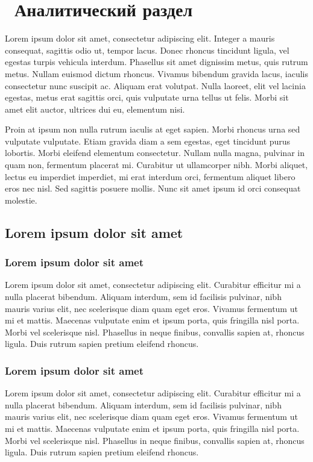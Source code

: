 \chapter{ Аналитический раздел}
\label{cha:analysis}
%
%
Lorem ipsum dolor sit amet, consectetur adipiscing elit. Integer a mauris consequat, sagittis odio ut, tempor lacus. Donec rhoncus tincidunt ligula, vel egestas turpis vehicula interdum. Phasellus sit amet dignissim metus, quis rutrum metus. Nullam euismod dictum rhoncus. Vivamus bibendum gravida lacus, iaculis consectetur nunc suscipit ac. Aliquam erat volutpat. Nulla laoreet, elit vel lacinia egestas, metus erat sagittis orci, quis vulputate urna tellus ut felis. Morbi sit amet elit auctor, ultrices dui eu, elementum nisi.

Proin at ipsum non nulla rutrum iaculis at eget sapien. Morbi rhoncus urna sed vulputate vulputate. Etiam gravida diam a sem egestas, eget tincidunt purus lobortis. Morbi eleifend elementum consectetur. Nullam nulla magna, pulvinar in quam non, fermentum placerat mi. Curabitur ut ullamcorper nibh. Morbi aliquet, lectus eu imperdiet imperdiet, mi erat interdum orci, fermentum aliquet libero eros nec nisl. Sed sagittis posuere mollis. Nunc sit amet ipsum id orci consequat molestie.




\section{Lorem ipsum dolor sit amet}
\subsection{Lorem ipsum dolor sit amet}
Lorem ipsum dolor sit amet, consectetur adipiscing elit. Curabitur efficitur mi a nulla placerat bibendum. Aliquam interdum, sem id facilisis pulvinar, nibh mauris varius elit, nec scelerisque diam quam eget eros. Vivamus fermentum ut mi et mattis. Maecenas vulputate enim et ipsum porta, quis fringilla nisl porta. Morbi vel scelerisque nisl. Phasellus in neque finibus, convallis sapien at, rhoncus ligula. Duis rutrum sapien pretium eleifend rhoncus.

\subsection{Lorem ipsum dolor sit amet}
Lorem ipsum dolor sit amet, consectetur adipiscing elit. Curabitur efficitur mi a nulla placerat bibendum. Aliquam interdum, sem id facilisis pulvinar, nibh mauris varius elit, nec scelerisque diam quam eget eros. Vivamus fermentum ut mi et mattis. Maecenas vulputate enim et ipsum porta, quis fringilla nisl porta. Morbi vel scelerisque nisl. Phasellus in neque finibus, convallis sapien at, rhoncus ligula. Duis rutrum sapien pretium eleifend rhoncus.


